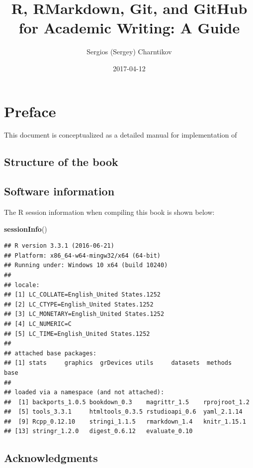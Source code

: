\documentclass[]{book}
\title{R, RMarkdown, Git, and GitHub for Academic Writing: A Guide}
\author{Sergios (Sergey) Charntikov}
\date{2017-04-12}
\newenvironment{Shaded}{\begin{snugshade}}{\end{snugshade}}
\newcommand{\KeywordTok}[1]{\textcolor[rgb]{0.13,0.29,0.53}{\textbf{{#1}}}}
\newcommand{\NormalTok}[1]{{#1}}
\begin{document}
\maketitle

{
\setcounter{tocdepth}{1}
\tableofcontents
}
\chapter{Preface}\label{preface}

This document is conceptualized as a detailed manual for implementation
of

\section{Structure of the book}\label{structure-of-the-book}

\section{Software information}\label{software-information}

The R session information when compiling this book is shown below:

\begin{Shaded}
\begin{Highlighting}[]
\KeywordTok{sessionInfo}\NormalTok{()}
\end{Highlighting}
\end{Shaded}

\begin{verbatim}
## R version 3.3.1 (2016-06-21)
## Platform: x86_64-w64-mingw32/x64 (64-bit)
## Running under: Windows 10 x64 (build 10240)
## 
## locale:
## [1] LC_COLLATE=English_United States.1252 
## [2] LC_CTYPE=English_United States.1252   
## [3] LC_MONETARY=English_United States.1252
## [4] LC_NUMERIC=C                          
## [5] LC_TIME=English_United States.1252    
## 
## attached base packages:
## [1] stats     graphics  grDevices utils     datasets  methods   base     
## 
## loaded via a namespace (and not attached):
##  [1] backports_1.0.5 bookdown_0.3    magrittr_1.5    rprojroot_1.2  
##  [5] tools_3.3.1     htmltools_0.3.5 rstudioapi_0.6  yaml_2.1.14    
##  [9] Rcpp_0.12.10    stringi_1.1.5   rmarkdown_1.4   knitr_1.15.1   
## [13] stringr_1.2.0   digest_0.6.12   evaluate_0.10
\end{verbatim}

\section{Acknowledgments}\label{acknowledgments}
\end{document}
